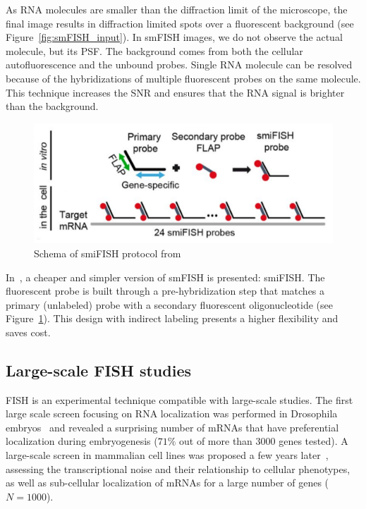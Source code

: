 \noindent
As \ac{RNA} molecules are smaller than the diffraction limit of the microscope, the final image results in diffraction limited spots over a fluorescent background (see Figure~\ref{fig:smFISH_input}).
In \ac{smFISH} images, we do not observe the actual molecule, but its \ac{PSF}.
The background comes from both the cellular autofluorescence and the unbound probes.
Single \ac{RNA} molecule can be resolved because of the hybridizations of multiple fluorescent probes on the same molecule.
This technique increases the \ac{SNR} and ensures that the \ac{RNA} signal is brighter than the background.

\begin{figure}
	\begin{center}
	\includegraphics[width=\linewidth]{figures/introduction/smiFISH}
	\caption[Schema of smiFISH protocol]{Schema of smiFISH protocol from~\cite{tsanov_smifish_2016}}
	\label{fig:smiFISH}
	\end{center}
\end{figure}

In~\cite{tsanov_smifish_2016}, a cheaper and simpler version of \ac{smFISH} is presented: \ac{smiFISH}.
The fluorescent probe is built through a pre-hybridization step that matches a primary (unlabeled) probe with a secondary fluorescent oligonucleotide (see Figure~\ref{fig:smiFISH}).
This design with indirect labeling presents a higher flexibility and saves cost.

\subsection{Large-scale FISH studies}
\label{subsec:intro_scale_fish}

FISH is an experimental technique compatible with large-scale studies. The first large scale screen focusing on RNA localization was performed in Drosophila embryos~\cite{lecuyer_global_2007} and revealed a surprising number of mRNAs that have preferential localization during embryogenesis ($71\%$ out of more than 3000 genes tested). 
A large-scale screen in mammalian cell lines was proposed a few years later~\cite{Battich2013,Battich2015}, assessing the transcriptional noise and their relationship to cellular phenotypes, as well as sub-cellular localization of m\ac{RNA}s for a large number of genes ($N=1000$). 

